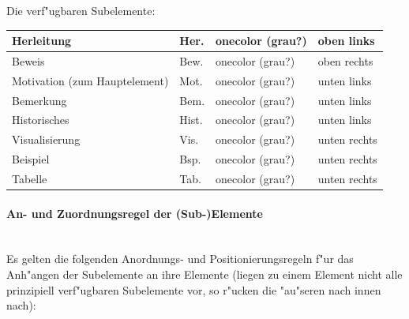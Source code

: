 Die verf"ugbaren Subelemente:
\begin{center}
\begin{tabular}{|l|l|l|l|}
\hline
Herleitung                                      & Her.  & onecolor (grau?)      & oben links\\
\hline
Beweis                                          & Bew.  & onecolor (grau?)      & oben rechts\\
\hline
Motivation \footnotesize{(zum Hauptelement)}    & Mot.  & onecolor (grau?)      & unten links\\
\hline
Bemerkung                                       & Bem.  & onecolor (grau?)      & unten links\\
\hline
Historisches                                    & Hist. & onecolor (grau?)      & unten links\\
\hline
Visualisierung                                  & Vis.  & onecolor (grau?)      & unten rechts\\
\hline
Beispiel                                        & Bsp.  & onecolor (grau?)      & unten rechts\\
\hline
Tabelle                                         & Tab.  & onecolor (grau?)      & unten rechts\\
\hline
\end{tabular}
\end{center}

\clearpage

\paragraph{An- und Zuordnungsregel der (Sub-)Elemente}\label{netz:anordnungsregeln}\mbox{ }\\[-2ex]


Es gelten die folgenden Anordnungs- und Positionierungsregeln f"ur das
Anh"angen der Subelemente an ihre Elemente (liegen zu einem Element
nicht alle prinzipiell verf"ugbaren Subelemente vor, so r"ucken die
"au"seren nach innen nach):

